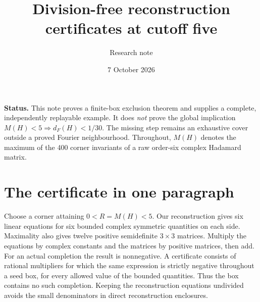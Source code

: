 \documentclass[11pt]{article}
\title{Division-free reconstruction certificates at cutoff five}
\author{Research note}\date{7 October 2026}
\begin{document}
\maketitle
\noindent\textbf{Status.} This note proves a finite-box exclusion theorem
and supplies a complete, independently replayable example. It does
\emph{not} prove the global implication $M(H)<5\Rightarrow d_F(H)<1/30$.
The missing step remains an exhaustive cover outside a proved Fourier
neighbourhood. Throughout, $M(H)$ denotes the maximum of the 400 corner
invariants of a raw order-six complex Hadamard matrix.

\section*{The certificate in one paragraph}
Choose a corner attaining $0<R=M(H)<5$. Our reconstruction gives six
linear equations for six bounded complex symmetric quantities on each
side. Maximality also gives twelve positive semidefinite $3\times3$
matrices. Multiply the equations by complex constants and the matrices
by positive matrices, then add. For an actual completion the result is
nonnegative. A certificate consists of rational multipliers for which
the same expression is strictly negative throughout a seed box, for
every allowed value of the bounded quantities. Thus the box contains
no such completion. Keeping the reconstruction equations undivided
avoids the small denominators in direct reconstruction enclosures.
\end{document}
